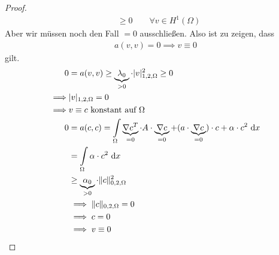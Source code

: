 \begin{proof}
\begin{align*}
&\geq 0\qquad\forall v\in H^1(\Omega)
\end{align*}
Aber wir müssen noch den Fall \dq$=0$\dq{} ausschließen. Also ist zu zeigen, dass
\begin{align*}
a(v,v)=0\implies v\equiv 0
\end{align*}
gilt.
\begin{align*}
0&=a(v,v)\geq\underbrace{\lambda_0}_{>0}\cdot|v|^2_{1,2,\Omega}\geq0 \\
\implies& |v|_{1,2,\Omega}=0 \\
\implies& v\equiv c\text{ konstant auf }\Omega\\
0&=a(c,c)=\int\limits_\Omega\underbrace{\nabla c^T}_{=0}\cdot A\cdot\underbrace{\nabla c}_{=0}+(a\cdot\underbrace{\nabla c}_{=0})\cdot c+\alpha\cdot c^2\text{ d} x\\
&=\int\limits_\Omega\alpha\cdot c^2\text{ d} x\\
&\geq\underbrace{\alpha_0}_{>0}\cdot\Vert c\Vert^2_{0,2,\Omega}\\
&\implies\Vert c\Vert_{0,2,\Omega}=0\\
&\implies c=0\\
&\implies v\equiv 0
\end{align*}


\end{proof}
